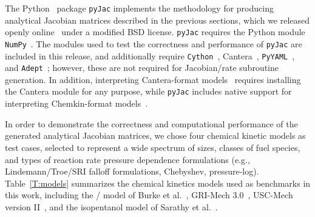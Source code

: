 \documentclass[preprint,12pt]{elsarticle}
\begin{document}
{The Python~\cite{Python:2015} package \texttt{pyJac} implements the methodology for producing analytical Jacobian matrices described in the previous sections, which we released openly online~\cite{Niemeyer:2015im} under a modified BSD license.
\texttt{pyJac} requires the Python module \texttt{NumPy}~\cite{Walt:2011aa}.
The modules used to test the correctness and performance of \texttt{pyJac} are included in this release, and additionally require \texttt{Cython}~\cite{Behnel:2011aa}, Cantera~\cite{Goodwin:2015aa}, \texttt{PyYAML}~\cite{Simonov:2014aa}, and \texttt{Adept}~\cite{adept-v11}; however, these are not required for Jacobian\slash rate subroutine generation.
In addition, interpreting Cantera-format models~\cite{Goodwin:2015aa} requires installing the Cantera module for any purpose, while \texttt{pyJac} includes native support for interpreting Chemkin-format models~\cite{chemkin:2012}.

In order to demonstrate the correctness and computational performance of the generated analytical Jacobian matrices, we chose four chemical kinetic models as test cases, selected to represent a wide spectrum of sizes, classes of fuel species, and types of reaction rate pressure dependence formulations (e.g., Lindemann\slash Troe\slash SRI falloff formulations, Chebyshev, pressure-log).
Table~\ref{T:models} summarizes the chemical kinetics models used as benchmarks in this work, including the \slash {} model of Burke et al.~\cite{Burke:2011fh}, GRI-Mech 3.0~\cite{smith_gri-mech_30}, USC-Mech version II~\cite{Wang:2007}, and the isopentanol model of Sarathy et al.~\cite{Sarathy:2013jr}.

}
\end{document}
